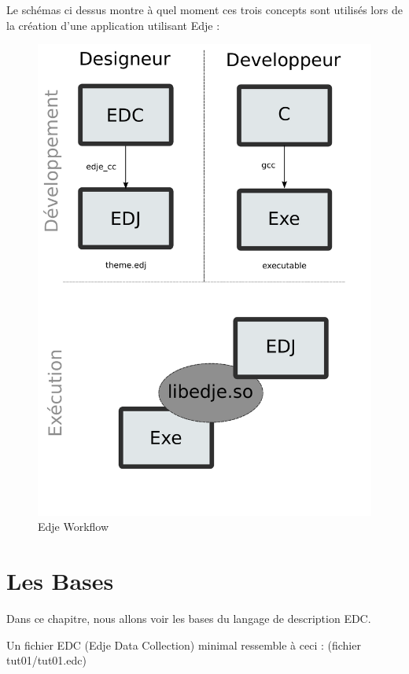 \documentclass[a4paper]{efr}
\begin{document}
Le schémas ci dessus montre à quel moment ces trois concepts sont utilisés lors
de la création d'une application utilisant Edje :

\begin{figure}
  \begin{center}
    \includegraphics[scale=0.7]{images/workflow.pdf}
  \end{center}
  \caption{Edje Workflow}
\end{figure}

\section{Les Bases}

Dans ce chapitre, nous allons voir les bases du langage de description EDC.

Un fichier EDC (Edje Data Collection) minimal ressemble à ceci : (fichier
tut01/tut01.edc)
\end{document}

